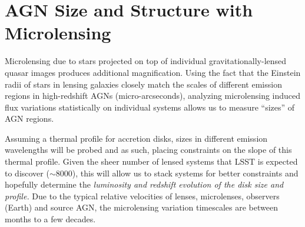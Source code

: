 %
%
%
%
%
%
%

\section{AGN Size and Structure with Microlensing}
\def\secname{\chpname:microlensing}\label{sec:\secname}




Microlensing due to stars projected on top of individual
gravitationally-lensed quasar images produces additional magnification.
Using the fact that the Einstein radii of stars in lensing galaxies
closely match the scales of different emission regions in
high-redshift AGNs (micro-arcseconds), analyzing microlensing induced
flux variations statistically on individual systems allows us to
measure ``sizes'' of AGN regions.

Assuming a thermal profile for accretion disks, sizes in different emission 
wavelengths will be probed and as such, placing constraints on the slope of this 
thermal profile. Given the sheer number of lensed systems that LSST is expected 
to discover ($\sim8000$), this will allow us to stack systems for better 
constraints and hopefully determine the {\it luminosity and redshift evolution 
of the disk size and profile.} Due to the typical relative velocities of lenses, 
microlenses, observers (Earth) and source AGN, the microlensing variation 
timescales are between months to a few decades.

